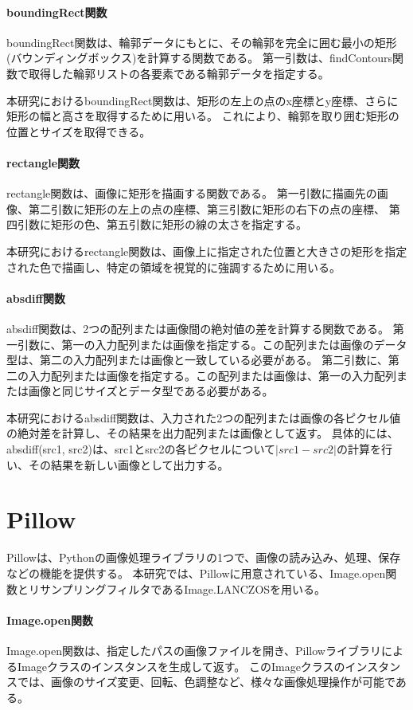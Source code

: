 \paragraph{boundingRect関数}
boundingRect関数は、輪郭データにもとに、その輪郭を完全に囲む最小の矩形(バウンディングボックス)を計算する関数である。
第一引数は、findContours関数で取得した輪郭リストの各要素である輪郭データを指定する。
\par
本研究におけるboundingRect関数は、矩形の左上の点のx座標とy座標、さらに矩形の幅と高さを取得するために用いる。
これにより、輪郭を取り囲む矩形の位置とサイズを取得できる。
\paragraph{rectangle関数}
rectangle関数は、画像に矩形を描画する関数である。
第一引数に描画先の画像、第二引数に矩形の左上の点の座標、第三引数に矩形の右下の点の座標、
第四引数に矩形の色、第五引数に矩形の線の太さを指定する。
\par
本研究におけるrectangle関数は、画像上に指定された位置と大きさの矩形を指定された色で描画し、特定の領域を視覚的に強調するために用いる。
\paragraph{absdiff関数}
absdiff関数は、2つの配列または画像間の絶対値の差を計算する関数である。
第一引数に、第一の入力配列または画像を指定する。この配列または画像のデータ型は、第二の入力配列または画像と一致している必要がある。
第二引数に、第二の入力配列または画像を指定する。この配列または画像は、第一の入力配列または画像と同じサイズとデータ型である必要がある。
\par
本研究におけるabsdiff関数は、入力された2つの配列または画像の各ピクセル値の絶対差を計算し、その結果を出力配列または画像として返す。
具体的には、absdiff(src1, src2)は、src1とsrc2の各ピクセルについて$|src1 - src2|$の計算を行い、その結果を新しい画像として出力する。

\section{Pillow}\label{sec:pillow}
Pillow\cite{Pillow}は、Python\cite{Python}の画像処理ライブラリの1つで、画像の読み込み、処理、保存などの機能を提供する。
本研究では、Pillowに用意されている、Image.open関数とリサンプリングフィルタであるImage.LANCZOSを用いる。
\paragraph{Image.open関数}
Image.open関数は、指定したパスの画像ファイルを開き、PillowライブラリによるImageクラスのインスタンスを生成して返す。
このImageクラスのインスタンスでは、画像のサイズ変更、回転、色調整など、様々な画像処理操作が可能である。
